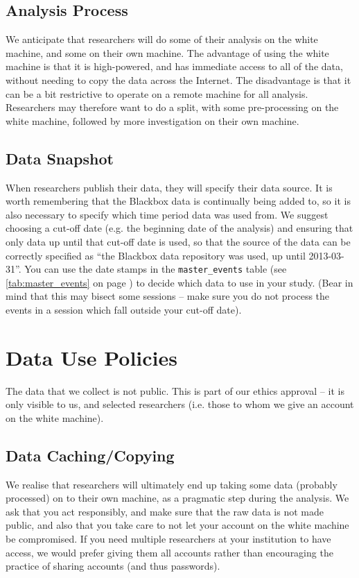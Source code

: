 \documentclass{report}
\newcommand{\myref}[1]{\autoref{#1} on page \pageref*{#1}}
\newcommand{\tabref}[1]{\lstinline|#1| table (see \myref{tab:#1})}
\begin{document}
\section{Analysis Process}

We anticipate that researchers will do some of their analysis on the white
machine, and some on their own machine.  The advantage of using the white
machine is that it is high-powered, and has immediate access to all of the
data, without needing to copy the data across the Internet.  The disadvantage
is that it can be a bit restrictive to operate on a remote machine for all
analysis.  Researchers may therefore want to do a split, with some
pre-processing on the white machine, followed by more investigation on their
own machine.

\section{Data Snapshot}

When researchers publish their data, they will specify their data source.  It
is worth remembering that the Blackbox data is continually being added to, so
it is also necessary to specify which time period data was used from.  We
suggest choosing a cut-off date (e.g. the beginning date of the analysis) and
ensuring that only data up until that cut-off date is used, so that the source
of the data can be correctly specified as ``the Blackbox data repository was
used, up until 2013-03-31''.  You can use the date stamps in the
\tabref{master_events} to decide which data to use in your study.  (Bear in
mind that this may bisect some sessions -- make sure you do not process the
events in a session which fall outside your cut-off date).

\chapter{Data Use Policies}
\label{sec:data_use}

The data that we collect is not public.  This is part of our ethics approval
-- it is only visible to us, and selected researchers (i.e. those to whom we
give an account on the white machine).  

\section{Data Caching/Copying}

We realise that researchers will ultimately end up taking some data (probably
processed) on to their own machine, as a pragmatic step during the analysis.
We ask that you act responsibly, and make sure that the raw data is not made
public, and also that you take care to not let your account on the white
machine be compromised.  If you need multiple researchers at your institution
to have access, we would prefer giving them all accounts rather than
encouraging the practice of sharing accounts (and thus passwords).
\end{document}
